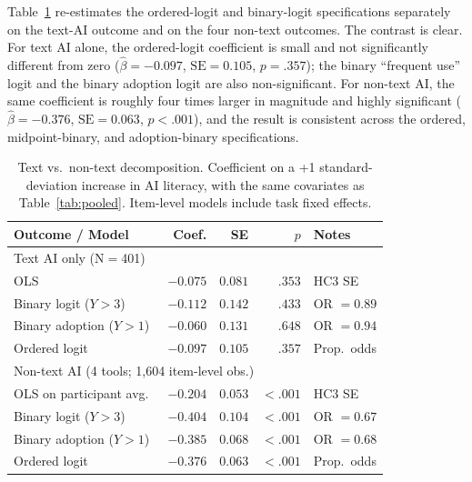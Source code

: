 \documentclass[11pt]{article}
\begin{document}
Table~\ref{tab:decomposition} re-estimates the ordered-logit and binary-logit
specifications separately on the text-AI outcome and on the four non-text
outcomes. The contrast is clear. For text AI alone, the ordered-logit
coefficient is small and not significantly different from zero
($\hat\beta = -0.097$, $\mathrm{SE} = 0.105$, $p = .357$); the binary
``frequent use'' logit and the binary adoption logit are also non-significant.
For non-text AI, the same coefficient is roughly four times larger in
magnitude and highly significant ($\hat\beta = -0.376$,
$\mathrm{SE} = 0.063$, $p < .001$), and the result is consistent across the
ordered, midpoint-binary, and adoption-binary specifications.

\begin{table}[t]
  \centering
  \caption{Text vs.\ non-text decomposition. Coefficient on a +1
    standard-deviation increase in AI literacy, with the same covariates as
    Table~\ref{tab:pooled}. Item-level models include task fixed effects.}
  \label{tab:decomposition}
  \begin{tabular}{lrrrl}
    \toprule
    \textbf{Outcome / Model} & \textbf{Coef.} & \textbf{SE} & \textbf{$p$} & \textbf{Notes} \\
    \midrule
    \multicolumn{5}{l}{Text AI only (N$=$401)} \\
    \quad OLS                              & $-0.075$ & $0.081$ & $.353$ & HC3 SE       \\
    \quad Binary logit ($Y > 3$)           & $-0.112$ & $0.142$ & $.433$ & OR $= 0.89$ \\
    \quad Binary adoption ($Y > 1$)        & $-0.060$ & $0.131$ & $.648$ & OR $= 0.94$ \\
    \quad Ordered logit                    & $-0.097$ & $0.105$ & $.357$ & Prop.\ odds \\
    \midrule
    \multicolumn{5}{l}{Non-text AI (4 tools; 1{,}604 item-level obs.)} \\
    \quad OLS on participant avg.\         & $-0.204$ & $0.053$ & $< .001$ & HC3 SE      \\
    \quad Binary logit ($Y > 3$)           & $-0.404$ & $0.104$ & $< .001$ & OR $= 0.67$ \\
    \quad Binary adoption ($Y > 1$)        & $-0.385$ & $0.068$ & $< .001$ & OR $= 0.68$ \\
    \quad Ordered logit                    & $-0.376$ & $0.063$ & $< .001$ & Prop.\ odds \\
    \bottomrule
  \end{tabular}
\end{table}
\end{document}
